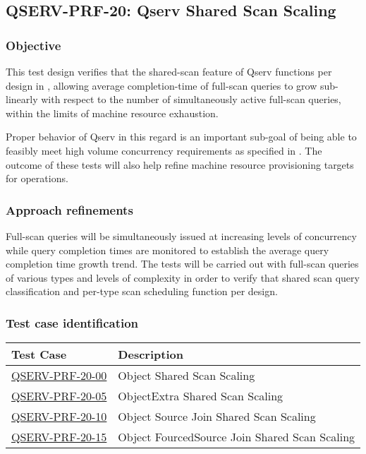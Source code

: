 \subsection{\textsc{QSERV-PRF-20}: Qserv Shared Scan Scaling}
\label{qserv-prf-20}

\subsubsection{Objective}

This test design verifies that the shared-scan feature of Qserv functions per design in ,
allowing average completion-time of full-scan queries to grow sub-linearly with respect to the number of
simultaneously active full-scan queries, within the limits of machine resource exhaustion.

Proper behavior of Qserv in this regard is an important sub-goal of being able to feasibly meet high 
volume concurrency requirements as specified in .  The outcome of these tests will also
help refine machine resource provisioning targets for operations.

\subsubsection{Approach refinements}

Full-scan queries will be simultaneously issued at increasing levels of concurrency while query 
completion times are monitored to establish the average query completion time growth trend.  The
tests will be carried out with full-scan queries of various types and levels of complexity in order
to verify that shared scan query classification and per-type scan scheduling function per design. 

\subsubsection{Test case identification}

\begin{longtable} {|p{}|p{}|}\hline
\textbf{Test Case}  & \textbf{Description} \\\hline
\hyperref[qserv-prf-20-00]{\textsc{QSERV-PRF-20-00}} & Object Shared Scan Scaling \\\hline
\hyperref[qserv-prf-20-05]{\textsc{QSERV-PRF-20-05}} & ObjectExtra Shared Scan Scaling \\\hline
\hyperref[qserv-prf-20-10]{\textsc{QSERV-PRF-20-10}} & Object Source Join Shared Scan Scaling \\\hline
\hyperref[qserv-prf-20-15]{\textsc{QSERV-PRF-20-15}} & Object FourcedSource Join Shared Scan Scaling \\\hline
\end{longtable}
